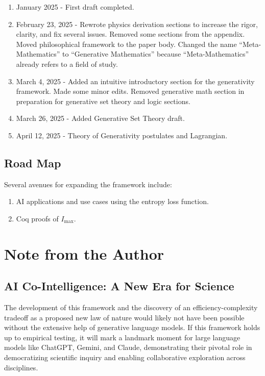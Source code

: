 \documentclass[12pt]{article}
\begin{document}
\begin{enumerate}
    \item January 2025 - First draft completed.
    \item February 23, 2025 - Rewrote physics derivation sections to increase the rigor, clarity, and fix several issues. Removed some sections from the appendix. Moved philosophical framework to the paper body. Changed the name ``Meta-Mathematics'' to ``Generative Mathematics'' because ``Meta-Mathematics'' already refers to a field of study.
    \item March 4, 2025 - Added an intuitive introductory section for the generativity framework. Made some minor edits. Removed generative math section in preparation for generative set theory and logic sections.
    \item March 26, 2025 - Added Generative Set Theory draft.
    \item April 12, 2025 - Theory of Generativity postulates and Lagrangian.
\end{enumerate}

\subsection{Road Map}
Several avenues for expanding the framework include:
\begin{enumerate}
    \item AI applications and use cases using the entropy loss function.
    \item Coq proofs of $I_\text{max}$.
\end{enumerate}

\section*{Note from the Author}

\subsection*{AI Co-Intelligence: A New Era for Science}

The development of this framework and the discovery of an efficiency-complexity tradeoff as a proposed new law of nature would likely not have been possible without the extensive help of generative language models. If this framework holds up to empirical testing, it will mark a landmark moment for large language models like ChatGPT, Gemini, and Claude, demonstrating their pivotal role in democratizing scientific inquiry and enabling collaborative exploration across disciplines.
\end{document}
